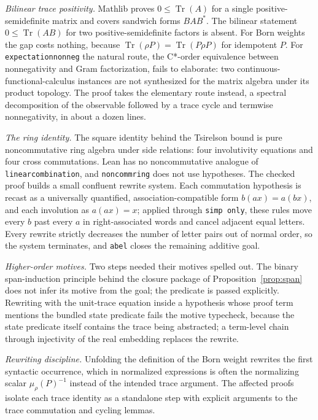 \documentclass[11pt]{article}
\renewcommand{\_}{\textunderscore\allowbreak}
\theoremstyle{remark}
\newcommand{\Tr}{\operatorname{Tr}}
\begin{document}
\emph{Bilinear trace positivity.} Mathlib proves $0\le\Tr(A)$ for a single
positive-semidefinite matrix and covers sandwich forms $BAB^*$. The
bilinear statement $0\le\Tr(AB)$ for two positive-semidefinite factors is
absent. For Born weights the gap costs nothing, because
$\Tr(\rho P)=\Tr(P\rho P)$ for idempotent $P$. For
\texttt{expectation\_nonneg} the natural route, the C*-order equivalence
between nonnegativity and Gram factorization, fails to elaborate: two
continuous-functional-calculus instances are not synthesized for the matrix
algebra under its product topology. The proof takes the elementary route
instead, a spectral decomposition of the observable followed by a trace
cycle and termwise nonnegativity, in about a dozen lines.

\emph{The ring identity.} The square identity behind the Tsirelson bound is
pure noncommutative ring algebra under side relations: four involutivity
equations and four cross commutations. Lean has no noncommutative analogue
of \texttt{linear\_combination}, and \texttt{noncomm\_ring} does not use
hypotheses. The checked proof builds a small confluent rewrite system. Each
commutation hypothesis is recast as a universally quantified,
association-compatible form $b(ax)=a(bx)$, and each involution as
$a(ax)=x$; applied through \texttt{simp only}, these rules move every $b$
past every $a$ in right-associated words and cancel adjacent equal letters.
Every rewrite strictly decreases the number of letter pairs out of normal
order, so the system terminates, and \texttt{abel} closes the remaining
additive goal.

\emph{Higher-order motives.} Two steps needed their motives spelled out.
The binary span-induction principle behind the closure package of
Proposition~\ref{prop:span} does not infer its motive from the goal; the
predicate is passed explicitly. Rewriting with the unit-trace equation
inside a hypothesis whose proof term mentions the bundled state predicate
fails the motive typecheck, because the state predicate itself contains the
trace being abstracted; a term-level chain through injectivity of the real
embedding replaces the rewrite.

\emph{Rewriting discipline.} Unfolding the definition of the Born weight
rewrites the first syntactic occurrence, which in normalized expressions is
often the normalizing scalar $\mu_\rho(P)^{-1}$ instead of the intended trace
argument. The affected proofs isolate each trace identity as a standalone
step with explicit arguments to the trace commutation and cycling lemmas.
\end{document}
